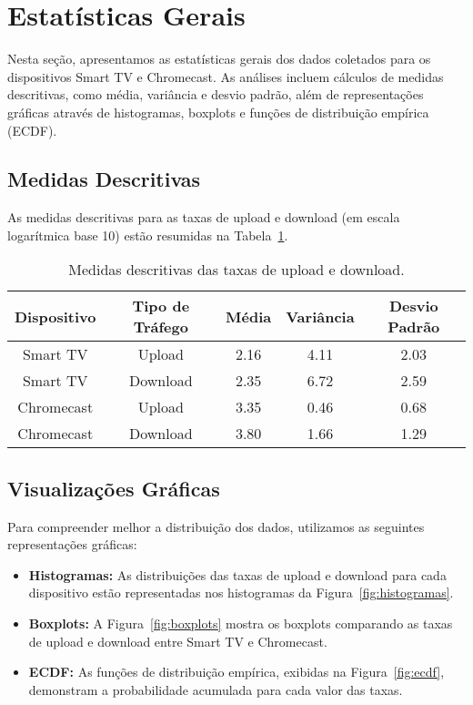\section{Estatísticas Gerais}

Nesta seção, apresentamos as estatísticas gerais dos dados coletados para os dispositivos Smart TV e Chromecast. As análises incluem cálculos de medidas descritivas, como média, variância e desvio padrão, além de representações gráficas através de histogramas, boxplots e funções de distribuição empírica (ECDF). 

\subsection{Medidas Descritivas}

As medidas descritivas para as taxas de upload e download (em escala logarítmica base 10) estão resumidas na Tabela~\ref{tab:estatisticas}. 

\begin{table}[H]
\centering
\caption{Medidas descritivas das taxas de upload e download.}
\label{tab:estatisticas}
\begin{tabular}{|c|c|c|c|c|}
\hline
\textbf{Dispositivo} & \textbf{Tipo de Tráfego} & \textbf{Média} & \textbf{Variância} & \textbf{Desvio Padrão} \\ \hline
Smart TV & Upload & 2.16 & 4.11 & 2.03 \\ \hline
Smart TV & Download & 2.35 & 6.72 & 2.59 \\ \hline
Chromecast & Upload & 3.35 & 0.46 & 0.68 \\ \hline
Chromecast & Download & 3.80 & 1.66 & 1.29 \\ \hline
\end{tabular}
\end{table}

\subsection{Visualizações Gráficas}

Para compreender melhor a distribuição dos dados, utilizamos as seguintes representações gráficas:

\begin{itemize}
    \item \textbf{Histogramas:} As distribuições das taxas de upload e download para cada dispositivo estão representadas nos histogramas da Figura~\ref{fig:histogramas}.
    \item \textbf{Boxplots:} A Figura~\ref{fig:boxplots} mostra os boxplots comparando as taxas de upload e download entre Smart TV e Chromecast.
    \item \textbf{ECDF:} As funções de distribuição empírica, exibidas na Figura~\ref{fig:ecdf}, demonstram a probabilidade acumulada para cada valor das taxas.
\end{itemize}

